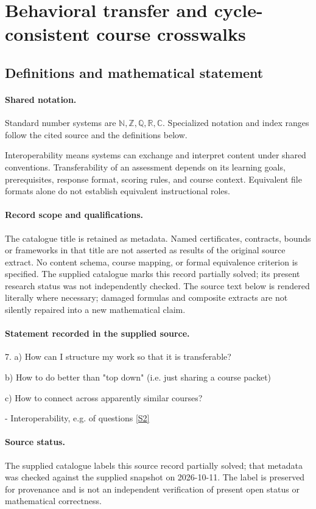 \documentclass[11pt]{article}
\newcommand{\sref}[2]{\hyperlink{source:#1:#2}{[S#2]}}
\begin{document}
\section{Behavioral transfer and cycle-consistent course crosswalks}\label{statement}

\subsection{Definitions and mathematical statement}

\paragraph{Shared notation.}Standard number systems are $\mathbb N,\mathbb Z,\mathbb Q,\mathbb R,\mathbb C$. Specialized notation and index ranges follow the cited source and the definitions below.


Interoperability means systems can exchange and interpret content under shared conventions. Transferability of an assessment depends on its learning goals, prerequisites, response format, scoring rules, and course context. Equivalent file formats alone do not establish equivalent instructional roles.
\paragraph{Record scope and qualifications.}
The catalogue title is retained as metadata. Named certificates, contracts, bounds or frameworks in that title are not asserted as results of the original source extract.
No content schema, course mapping, or formal equivalence criterion is specified. The supplied catalogue marks this record partially solved; its present research status was not independently checked.
The source text below is rendered literally where necessary; damaged formulas and composite extracts are not silently repaired into a new mathematical claim.
\paragraph{Statement recorded in the supplied source.}
7. a) How can I structure my work so that it is transferable?

b) How to do better than "top down" (i.e. just sharing a course packet)

c) How to connect across apparently similar courses?

- Interoperability, e.g. of questions \sref{statement}{2}
\paragraph{Source status.}
The supplied catalogue labels this source record partially solved; that metadata was checked against the supplied snapshot on 2026-10-11. The label is preserved for provenance and is not an independent verification of present open status or mathematical correctness.
\end{document}

